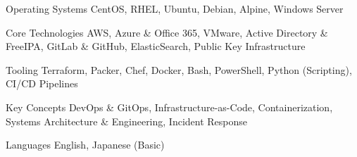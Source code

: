 


\begin{cvskills}


\cvskill
{Operating Systems} %
{CentOS, RHEL, Ubuntu, Debian, Alpine, Windows Server} %


\cvskill
{Core Technologies} %
{AWS, Azure \& Office 365, VMware, Active Directory \& FreeIPA, GitLab \& GitHub, ElasticSearch, Public Key Infrastructure} %


\cvskill
{Tooling} %
{Terraform, Packer, Chef, Docker, Bash, PowerShell, Python (Scripting), CI/CD Pipelines} %


\cvskill
{Key Concepts} %
{DevOps \& GitOps, Infrastructure-as-Code, Containerization, Systems Architecture \& Engineering, Incident Response} %


\cvskill
{Languages} %
{English, Japanese (Basic)} %


\end{cvskills}
